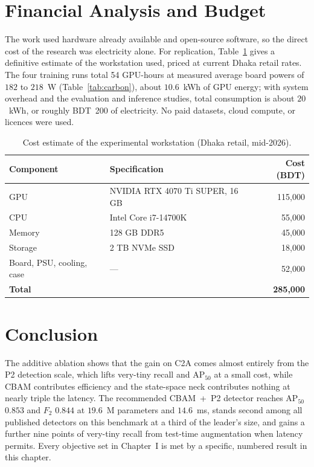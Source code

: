 \section{Financial Analysis and Budget}
\label{sec:budget}
The work used hardware already available and open-source software, so the
direct cost of the research was electricity alone. For replication,
Table~\ref{tab:budget} gives a definitive estimate of the workstation used,
priced at current Dhaka retail rates. The four training runs total 54
GPU-hours at measured average board powers of $182$ to $218$~W
(Table~\ref{tab:carbon}), about $10.6$~kWh of GPU energy; with system
overhead and the evaluation and inference studies, total consumption is
about $20$~kWh, or roughly BDT~200 of electricity. No paid datasets, cloud
compute, or licences were used.

\begin{table}[H]
  \centering
  \caption{Cost estimate of the experimental workstation (Dhaka retail, mid-2026).}
  \label{tab:budget}
  \begin{tabular}{@{}l l r@{}}
    \toprule
    \textbf{Component} & \textbf{Specification} & \textbf{Cost (BDT)} \\
    \midrule
    GPU & NVIDIA RTX 4070 Ti SUPER, 16 GB & 115{,}000 \\
    CPU & Intel Core i7-14700K & 55{,}000 \\
    Memory & 128 GB DDR5 & 45{,}000 \\
    Storage & 2 TB NVMe SSD & 18{,}000 \\
    Board, PSU, cooling, case & --- & 52{,}000 \\
    \midrule
    \textbf{Total} & & \textbf{285{,}000} \\
    \bottomrule
  \end{tabular}
\end{table}

\section{Conclusion}
The additive ablation shows that the gain on C2A comes almost entirely from
the P2 detection scale, which lifts very-tiny recall and $\mathrm{AP}_{50}$
at a small cost, while CBAM contributes efficiency and the state-space neck
contributes nothing at nearly triple the latency. The recommended CBAM~+~P2
detector reaches $\mathrm{AP}_{50}$ $0.853$ and $F_2$ $0.844$ at $19.6$~M
parameters and $14.6$~ms, stands second among all published detectors on this
benchmark at a third of the leader's size, and gains a further nine points of
very-tiny recall from test-time augmentation when latency permits. Every
objective set in Chapter~I is met by a specific, numbered result in this
chapter.
